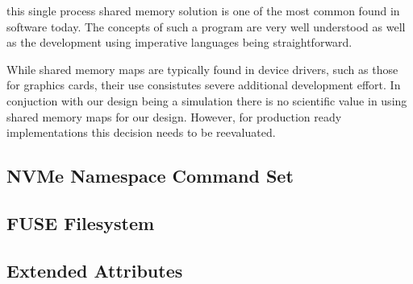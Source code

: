 this single process shared memory solution is one of the most common found in
software today. The concepts of such a program are very well understood as
well as the development using imperative languages being straightforward.

While shared memory maps are typically found in device drivers, such as those
for graphics cards, their use consistutes severe additional development effort.
In conjuction with our design being a simulation there is no scientific value in
using shared memory maps for our design. However, for production ready
implementations this decision needs to be reevaluated.

\subsection{NVMe Namespace Command Set}

\subsection{FUSE Filesystem}


\subsection{Extended Attributes}

